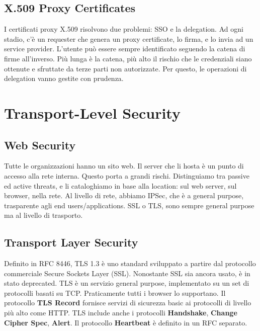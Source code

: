 \documentclass[11pt]{article}
\begin{document}
\subsection{X.509 Proxy Certificates}
I certificati proxy X.509 risolvono due problemi: SSO e la delegation. Ad ogni stadio, c'è un requester che genera un proxy certificate, lo firma, e lo invia ad un service provider. L'utente può essere sempre identificato seguendo la catena di firme all'inverso. Più lunga è la catena, più alto il rischio che le credenziali siano ottenute e sfruttate da terze parti non autorizzate. Per questo, le operazioni di delegation vanno gestite con prudenza.

\section{Transport-Level Security}
\subsection{Web Security}
Tutte le organizzazioni hanno un sito web. Il server che li hosta è un punto di accesso alla rete interna. Questo porta a grandi rischi. Distinguiamo tra passive ed active threats, e li cataloghiamo in base alla location: sul web server, sul browser, nella rete. 
Al livello di rete, abbiamo IPSec, che è a general purpose, trasparente agli end users/applications. SSL o TLS, sono sempre general purpose ma al livello di trasporto.
\subsection{Transport Layer Security}
Definito in RFC 8446, TLS 1.3 è uno standard sviluppato a partire dal protocollo commerciale Secure Sockets Layer (SSL). Nonostante SSL sia ancora usato, è in stato deprecated. TLS è un servizio general purpose, implementato su un set di protocolli basati su TCP. Praticamente tutti i browser lo supportano. Il protocollo \textbf{TLS Record} fornisce servizi di sicurezza basic ai protocolli di livello più alto come HTTP. TLS include anche i protocolli \textbf{Handshake}, \textbf{Change Cipher Spec}, \textbf{Alert}. Il protocollo \textbf{Heartbeat} è definito in un RFC separato. 
\end{document}
